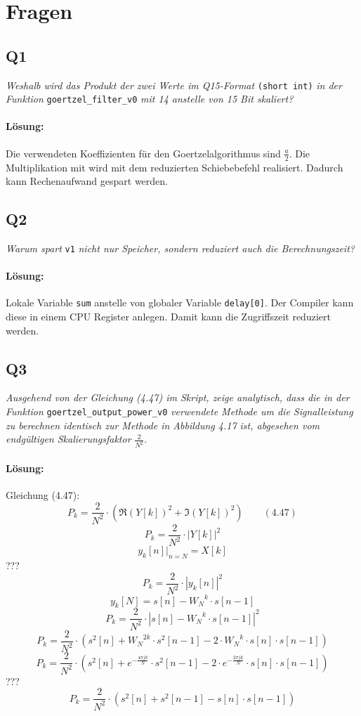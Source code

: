 \documentclass[a4,paper,fleqn]{article}
\begin{document}
\clearpage

\section{Fragen}

\subsection{Q1}
\label{q1}
\emph{Weshalb wird das Produkt der zwei Werte im Q15-Format}
\verb?(short int)?
\emph{in der Funktion}
\verb?goertzel_filter_v0?
\emph{mit 14 anstelle von 15 Bit skaliert? }
\paragraph{Lösung: }
Die verwendeten Koeffizienten für den Goertzelalgorithmus sind $\frac{a}{2}$. 
Die Multiplikation mit wird mit dem reduzierten Schiebebefehl realisiert. 
Dadurch kann Rechenaufwand gespart werden. 
\subsection{Q2}
\label{q2}
\emph{Warum spart}
\verb?v1?
\emph{nicht nur Speicher, sondern reduziert auch die 
Berechnungszeit?}
\paragraph{Lösung: }
Lokale Variable \verb?sum? anstelle von globaler Variable \verb?delay[0]?. Der 
Compiler kann diese in einem CPU Register anlegen. Damit kann die Zugriffszeit 
reduziert werden. 

\subsection{Q3}
\label{q3}
\emph{Ausgehend von der Gleichung (4.47) im Skript, zeige analytisch, dass die 
in der Funktion}
\verb?goertzel_output_power_v0?
\emph{verwendete Methode um die Signalleistung zu berechnen identisch zur 
Methode in Abbildung 4.17 ist, abgesehen vom endgültigen Skalierungsfaktor}
$\frac{2}{N^2}$.
\paragraph{Lösung: }
Gleichung (4.47):
\[
    P_k =
    \frac{2}{N^2} \cdot
    \left(
        \Re(Y[k])^2 + \Im(Y[k])^2
    \right)
    \qquad (4.47)
\]
\[
    P_k =
    \frac{2}{N^2} \cdot
    \left|
        Y[k]
    \right|^2
\]
\[
    y_k[n] |_{n = N} = X[k]
\]
???
\[
    P_k =
    \frac{2}{N^2} \cdot
    \left|
        y_k[n]
    \right|^2
\]
\[
    y_k[N] = s[n] - {W_N}^{k} \cdot s[n-1]
\]
\[
    P_k =
    \frac{2}{N^2} \cdot
    \left|
        s[n] - {W_N}^{k} \cdot s[n-1]
    \right|^2
\]
\[
    P_k =
    \frac{2}{N^2} \cdot
    \left(
        s^2[n] +
        {W_N}^{2k} \cdot s^2[n-1] -
        2 \cdot {W_N}^{k} \cdot s[n] \cdot s[n-1]
    \right)
\]
\[
    P_k =
    \frac{2}{N^2} \cdot
    \left(
        s^2[n] +
        e^{-\frac{4 \pi j k}{N}} \cdot s^2[n-1] -
        2 \cdot e^{-\frac{2 \pi j k}{N}} \cdot s[n] \cdot s[n-1]
    \right)
\]
???
\[
    P_k =
    \frac{2}{N^2} \cdot
    \left(
        s^2[n]
        + s^2[n-1]
        - s[n] \cdot s[n-1]
    \right)
\]
\end{document}
